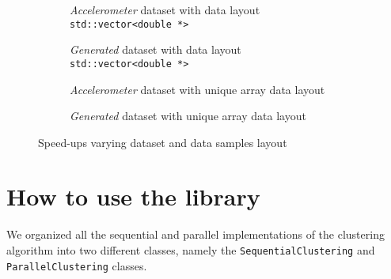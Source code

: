 \documentclass{article}
\begin{document}
\begin{figure}[H]
\begin{minipage}{\linewidth}
\centering
\begin{subfigure}[t]{.47\linewidth}%
%
\setlength{\abovecaptionskip}{0pt}%
\caption*{\textit{Accelerometer} dataset with data layout \texttt{std::vector<double *>}}%
\end{subfigure}%
%
\hspace{5mm}%
%
\begin{subfigure}[t]{.47\linewidth}%
%
\setlength{\abovecaptionskip}{0pt}%
\caption*{\textit{Generated} dataset with data layout \texttt{std::vector<double *>}}%
\end{subfigure}%
\end{minipage}
%
%
\begin{minipage}{\linewidth}
\centering
\begin{subfigure}[t]{.47\linewidth}%
%
\setlength{\abovecaptionskip}{0pt}%
\caption*{\textit{Accelerometer} dataset with unique array data layout}%
\end{subfigure}%
%
\hspace{5mm}%
%
\begin{subfigure}[t]{.47\linewidth}%
%
\setlength{\abovecaptionskip}{0pt}%
\caption*{\textit{Generated} dataset with unique array data layout}%
\end{subfigure}%
\end{minipage}
%
%
\begin{subfigure}{.47\linewidth}%
\hspace*{6pt}
%
\setlength{\abovecaptionskip}{0pt}%
\end{subfigure}%
\setlength{\abovecaptionskip}{4pt}%
\caption*{Speed-ups varying dataset and data samples layout}
\end{figure}

\vspace{-14pt}
\hypertarget{how-to-use-the-library}{
\section{How to use the library}
\label{how-to-use-the-library}}

We organized all the sequential and parallel implementations of the clustering algorithm into two
different classes, namely the \texttt{SequentialClustering} and \texttt{ParallelClustering} classes.
\end{document}

